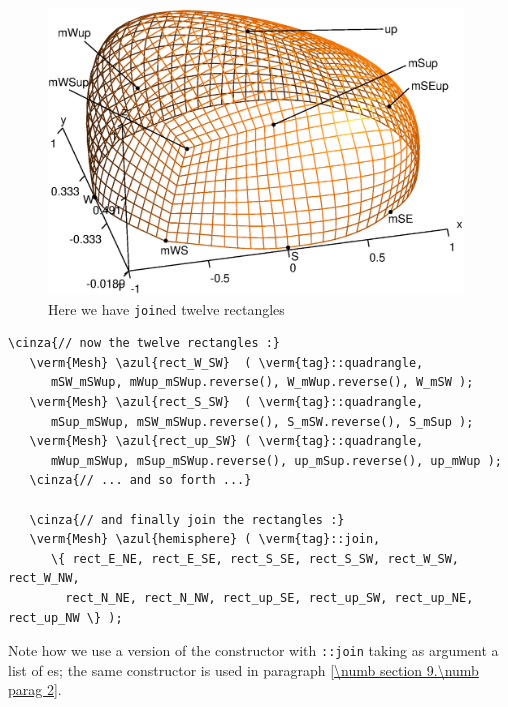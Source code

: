 \begin{figure}[ht] \centering
  \includegraphics[width=110mm]{hemisphere-2}
  \caption{Here we have {\small\tt join}ed twelve rectangles}
  \label{\numb section 2.\numb fig 7}
\end{figure}
	
\begin{Verbatim}[commandchars=\\\{\},formatcom=\small\tt,frame=single,
   label=parag-\ref{\numb section 2.\numb parag 7}.cpp,rulecolor=\color{coment},
   baselinestretch=0.94,framesep=2mm]
   \cinza{// now the twelve rectangles :}
   \verm{Mesh} \azul{rect_W_SW}  ( \verm{tag}::quadrangle,
      mSW_mSWup, mWup_mSWup.reverse(), W_mWup.reverse(), W_mSW );
   \verm{Mesh} \azul{rect_S_SW}  ( \verm{tag}::quadrangle,
      mSup_mSWup, mSW_mSWup.reverse(), S_mSW.reverse(), S_mSup );
   \verm{Mesh} \azul{rect_up_SW} ( \verm{tag}::quadrangle,
      mWup_mSWup, mSup_mSWup.reverse(), up_mSup.reverse(), up_mWup );
   \cinza{// ... and so forth ...}

   \cinza{// and finally join the rectangles :}
   \verm{Mesh} \azul{hemisphere} ( \verm{tag}::join,
      \{ rect_E_NE, rect_E_SE, rect_S_SE, rect_S_SW, rect_W_SW, rect_W_NW,
        rect_N_NE, rect_N_NW, rect_up_SE, rect_up_SW, rect_up_NE, rect_up_NW \} );
\end{Verbatim}

Note how we use a version of the {\small\tt {}} constructor with {\small\tt {}::join}
taking as argument a list of {\small\tt {}}es; the same constructor is used in
paragraph \ref{\numb section 9.\numb parag 2}.

